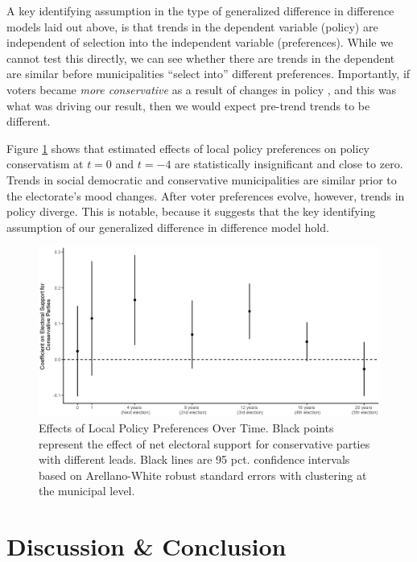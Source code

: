 \documentclass[a4paper,12pt]{article}
\begin{document}
A key identifying assumption in the type of generalized difference in difference models laid out above, is that trends in the dependent variable (policy) are independent of selection into the independent variable (preferences). While we cannot test this directly, we can see whether there are trends in the dependent are similar before municipalities ``select into'' different preferences. Importantly, if voters became \emph{more conservative} as a result of changes in policy \cite[cf.][]{lenz2013follow,slothuus2010can}, and this was what was driving our result, then we would expect pre-trend trends to be different.

Figure \ref{fig:LongRun} shows that estimated effects of local policy preferences on policy conservatism at $t=0$ and $t=-4$ are statistically insignificant and close to zero. Trends in social democratic and conservative municipalities are similar prior to the electorate's mood changes. After voter preferences evolve, however, trends in policy diverge.  This is notable, because it suggests that the key identifying assumption of our generalized difference in difference model hold.
 

\begin{figure}[h]
	\centering
	\includegraphics[scale = .6]{NoLag_varying_leads.eps}
	\caption{Effects of Local Policy Preferences Over Time. Black points represent the effect of net electoral support for conservative parties with different leads. Black lines are 95 pct. confidence intervals based on Arellano-White robust standard errors with clustering at the municipal level.}
	\label{fig:LongRun}
\end{figure}




\section*{Discussion \& Conclusion}



\onehalfspacing



\clearpage

\renewcommand{\thesubsection}{\Alph{subsection}}
\renewcommand{\thetable}{\Alph{subsection}\arabic{table}}
\renewcommand{\thefigure}{\Alph{subsection}\arabic{figure}}
\end{document}
